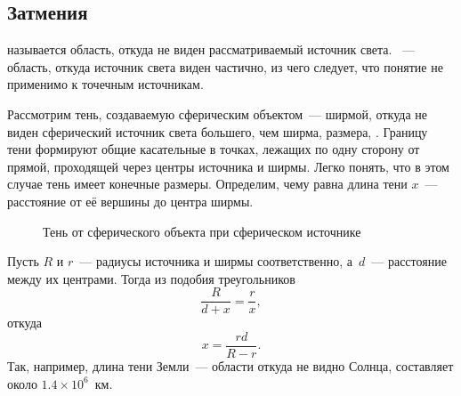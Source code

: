 \subsection{Затмения}
 называется область, откуда не виден рассматриваемый источник света. ~--- область, откуда источник света виден частично, из чего следует, что понятие  не применимо к точечным источникам.

Рассмотрим тень, создаваемую сферическим объектом~--- ширмой, откуда не виден сферический источник света большего, чем ширма, размера, . Границу тени формируют общие касательные в точках, лежащих по одну сторону от прямой, проходящей через центры источника и ширмы. Легко понять, что в этом случае тень имеет конечные размеры. Определим, чему равна длина тени $x$~--- расстояние от её вершины до центра ширмы.

\begin{figure}[h!]
    \centering
    \caption{Тень от сферического объекта при сферическом источнике}
    \label{pic:shadow-length}
\end{figure}

Пусть $R$ и $r$~--- радиусы источника и ширмы соответственно, а~$d$~--- расстояние между их центрами. Тогда из подобия треугольников
\begin{equation*}
    \frac{R}{d + x} = \frac{r}{x},
\end{equation*}
откуда
\begin{equation}
    x = \frac{r d}{R - r}.
\end{equation}
Так, например, длина тени Земли~--- области откуда не видно Солнца, составляет около $1.4 \times 10^{6}$~км.

